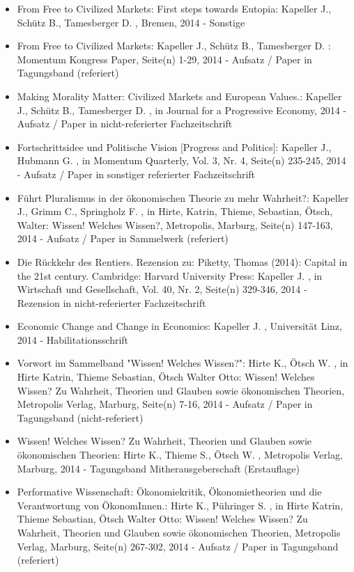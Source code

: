 \begin{itemize}
	 \item From Free to Civilized Markets: First steps towards Eutopia: Kapeller J., Schütz B., Tamesberger D. , Bremen, 2014 - Sonstige
	 \item From Free to Civilized Markets: Kapeller J., Schütz B., Tamesberger D. : Momentum Kongress Paper, Seite(n) 1-29, 2014 - Aufsatz / Paper in Tagungsband (referiert)
	 \item Making Morality Matter: Civilized Markets and European Values.: Kapeller J., Schütz B., Tamesberger D. , in Journal for a Progressive Economy, 2014 - Aufsatz / Paper in nicht-referierter Fachzeitschrift
	 \item Fortschrittsidee und Politische Vision [Progress and Politics]: Kapeller J., Hubmann G. , in Momentum Quarterly, Vol. 3, Nr. 4, Seite(n) 235-245, 2014 - Aufsatz / Paper in sonstiger referierter Fachzeitschrift
	 \item Führt Pluralismus in der ökonomischen Theorie zu mehr Wahrheit?: Kapeller J., Grimm C., Springholz F. , in Hirte, Katrin, Thieme, Sebastian, Ötsch, Walter: Wissen! Welches Wissen?, Metropolis, Marburg, Seite(n) 147-163, 2014 - Aufsatz / Paper in Sammelwerk (referiert)
	 \item Die Rückkehr des Rentiers. Rezension zu: Piketty, Thomas (2014): Capital in the 21st century. Cambridge: Harvard University Press: Kapeller J. , in Wirtschaft und Gesellschaft, Vol. 40, Nr. 2, Seite(n) 329-346, 2014 - Rezension in nicht-referierter Fachzeitschrift
	 \item Economic Change and Change in Economics: Kapeller J. , Universität Linz, 2014 - Habilitationsschrift
	 \item Vorwort im Sammelband "Wissen! Welches Wissen?": Hirte K., Ötsch W. , in Hirte Katrin, Thieme Sebastian, Ötsch Walter Otto: Wissen! Welches Wissen? Zu Wahrheit, Theorien und Glauben sowie ökonomischen Theorien, Metropolis Verlag, Marburg, Seite(n) 7-16, 2014 - Aufsatz / Paper in Tagungsband (nicht-referiert)
	 \item Wissen! Welches Wissen? Zu Wahrheit, Theorien und Glauben sowie ökonomischen Theorien: Hirte K., Thieme S., Ötsch W. , Metropolis Verlag, Marburg, 2014 - Tagungsband Mitherausgeberschaft (Erstauflage)
	 \item Performative Wissenschaft: Ökonomiekritik, Ökonomietheorien und die Verantwortung von ÖkonomInnen.: Hirte K., Pühringer S. , in Hirte Katrin, Thieme Sebastian, Ötsch Walter Otto: Wissen! Welches Wissen? Zu Wahrheit, Theorien und Glauben sowie ökonomischen Theorien, Metropolis Verlag, Marburg, Seite(n) 267-302, 2014 - Aufsatz / Paper in Tagungsband (referiert)

\end{itemize}
